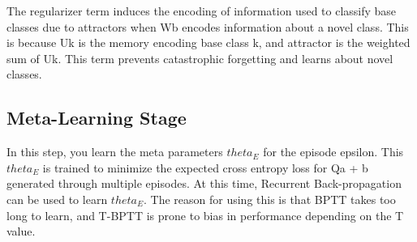 \documentclass[10pt,twocolumn,letterpaper]{article}
\begin{document}
The regularizer term induces the encoding of information used to classify base classes due to attractors when Wb encodes information about a novel class. This is because Uk is the memory encoding base class k, and attractor is the weighted sum of Uk. This term prevents catastrophic forgetting and learns about novel classes.

\subsection{Meta-Learning Stage}\label{meta}
In this step, you learn the meta parameters $ theta_E $ for the episode epsilon. This $ theta_E $ is trained to minimize the expected cross entropy loss for Qa + b generated through multiple episodes. At this time, Recurrent Back-propagation can be used to learn $ theta_E $. The reason for using this is that BPTT takes too long to learn, and T-BPTT is prone to bias in performance depending on the T value.


{\small

}
\end{document}
